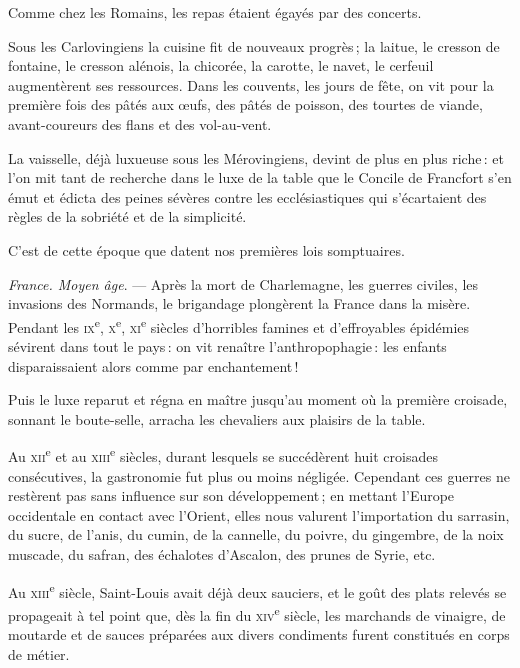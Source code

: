 Comme chez les Romains, les repas étaient égayés par des concerts.

Sous les Carlovingiens la cuisine fit de nouveaux progrès ; la laitue, le
cresson de fontaine, le cresson alénois, la chicorée, la carotte, le navet, le
cerfeuil augmentèrent ses ressources. Dans les couvents, les jours de fête, on
vit pour la première fois des pâtés aux œufs, des pâtés de poisson, des tourtes
de viande, avant-coureurs des flans et des vol-au-vent.

La vaisselle, déjà luxueuse sous les Mérovingiens, devint de plus en plus riche :
et l'on mit tant de recherche dans le luxe de la table que le Concile de Francfort
s'en émut et édicta des peines sévères contre les ecclésiastiques qui s'écartaient
des règles de la sobriété et de la simplicité.

C'est de cette époque que datent nos premières lois somptuaires.

\sk

\textit{France. Moyen âge}. — Après la mort de Charlemagne, les guerres
civiles, les invasions des Normands, le brigandage plongèrent la France dans la
misère. Pendant les \textsc{ix}\textsuperscript{e},
\textsc{x}\textsuperscript{e}, \textsc{xi}\textsuperscript{e} siècles
d'horribles famines et d'effroyables épidémies sévirent dans tout le pays : on
vit renaître l'anthropophagie : les enfants disparaissaient alors comme par
enchantement !

Puis le luxe reparut et régna en maître jusqu'au moment où la première
croisade, sonnant le boute-selle, arracha les chevaliers aux plaisirs de la
table.

Au \textsc{xii}\textsuperscript{e} et au \textsc{xiii}\textsuperscript{e}
siècles, durant lesquels se succédèrent huit croisades consécutives, la
gastronomie fut plus ou moins négligée. Cependant ces guerres ne restèrent pas
sans influence sur son développement ; en mettant l'Europe occidentale en
contact avec l'Orient, elles nous valurent l'importation du sarrasin, du sucre,
de l'anis, du cumin, de la cannelle, du poivre, du gingembre, de la noix
muscade, du safran, des échalotes d'Ascalon, des prunes de Syrie, etc.

Au \textsc{xiii}\textsuperscript{e} siècle, Saint-Louis avait déjà deux
sauciers, et le goût des plats relevés se propageait à tel point que, dès la
fin du \textsc{xiv}\textsuperscript{e} siècle, les marchands de vinaigre, de
moutarde et de sauces préparées aux divers condiments furent constitués en
corps de métier.

